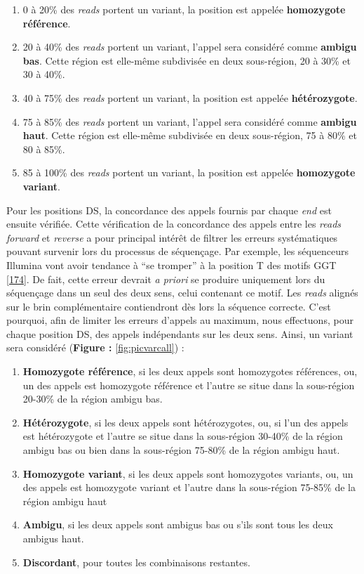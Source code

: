 \documentclass[12pt,a4paper,twoside]{ugathesis}
\theoremstyle{definition}
\theoremstyle{definition}
\theoremstyle{definition}
\theoremstyle{remark}
\begin{document}
\begin{enumerate}
\def\labelenumi{\arabic{enumi}.}
\item
  0 à 20\% des \emph{reads} portent un variant, la position est appelée
  \textbf{homozygote référence}.
\item
  20 à 40\% des \emph{reads} portent un variant, l'appel sera considéré
  comme \textbf{ambigu bas}. Cette région est elle-même subdivisée en
  deux sous-région, 20 à 30\% et 30 à 40\%.
\item
  40 à 75\% des \emph{reads} portent un variant, la position est appelée
  \textbf{hétérozygote}.
\item
  75 à 85\% des \emph{reads} portent un variant, l'appel sera considéré
  comme \textbf{ambigu haut}. Cette région est elle-même subdivisée en
  deux sous-région, 75 à 80\% et 80 à 85\%.
\item
  85 à 100\% des \emph{reads} portent un variant, la position est
  appelée \textbf{homozygote variant}.
\end{enumerate}

Pour les positions DS, la concordance des appels fournis par chaque
\emph{end} est ensuite vérifiée. Cette vérification de la concordance
des appels entre les \emph{reads forward} et \emph{reverse} a pour
principal intérêt de filtrer les erreurs systématiques pouvant survenir
lors du processus de séquençage. Par exemple, les séquenceurs Illumina
vont avoir tendance à ``se tromper'' à la position T des motifs GGT
{[}\protect\hyperlink{ref-Robinson2011}{174}{]}. De fait, cette erreur
devrait \emph{a priori} se produire uniquement lors du séquençage dans
un seul des deux sens, celui contenant ce motif. Les \emph{reads}
alignés sur le brin complémentaire contiendront dès lors la séquence
correcte. C'est pourquoi, afin de limiter les erreurs d'appels au
maximum, nous effectuons, pour chaque position DS, des appels
indépendants sur les deux sens. Ainsi, un variant sera considéré
(\textbf{Figure : }\ref{fig:picvarcall}) :

\begin{enumerate}
\def\labelenumi{\arabic{enumi}.}
\item
  \textbf{Homozygote référence}, si les deux appels sont homozygotes
  références, ou, un des appels est homozygote référence et l'autre se
  situe dans la sous-région 20-30\% de la région ambigu bas.
\item
  \textbf{Hétérozygote}, si les deux appels sont hétérozygotes, ou, si
  l'un des appels est hétérozygote et l'autre se situe dans la
  sous-région 30-40\% de la région ambigu bas ou bien dans la
  sous-région 75-80\% de la région ambigu haut.
\item
  \textbf{Homozygote variant}, si les deux appels sont homozygotes
  variants, ou, un des appels est homozygote variant et l'autre dans la
  sous-région 75-85\% de la région ambigu haut
\item
  \textbf{Ambigu}, si les deux appels sont ambigus bas ou s'ils sont
  tous les deux ambigus haut.
\item
  \textbf{Discordant}, pour toutes les combinaisons restantes.
\end{enumerate}
\end{document}
